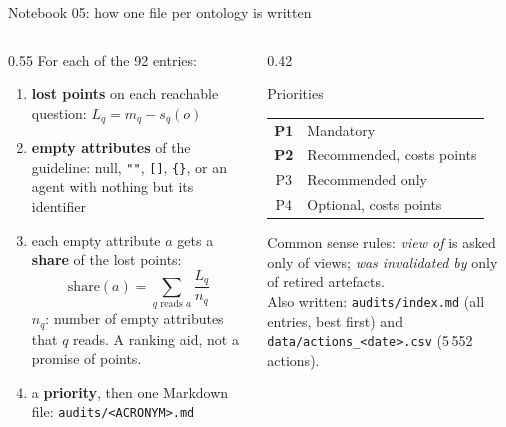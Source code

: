 \documentclass[aspectratio=169,10pt]{beamer}
\newcommand{\code}[1]{{\color{dtblue}\texttt{#1}}}
\begin{document}
\begin{frame}{Notebook 05: how one file per ontology is written}
  \begin{columns}[T]
    \begin{column}{0.55\textwidth}
      \small
      For each of the 92 entries:
      \begin{enumerate}
        \item \textbf{lost points} on each reachable question: $L_q = m_q - s_q(o)$
        \item \textbf{empty attributes} of the guideline: null, \code{""}, \code{[]}, \code{\{\}}, or an
              agent with nothing but its identifier
        \item each empty attribute $a$ gets a \textbf{share} of the lost points:
              \[ \text{share}(a) = \sum_{q \text{ reads } a} \frac{L_q}{n_q} \]
              {\scriptsize $n_q$: number of empty attributes that $q$ reads. A ranking aid, not a promise of points.}
        \item a \textbf{priority}, then one Markdown file: \code{audits/<ACRONYM>.md}
      \end{enumerate}
    \end{column}
    \begin{column}{0.42\textwidth}
      \begin{block}{Priorities}
        \small
        \begin{tabular}{@{}c l@{}}
          \textbf{P1} & Mandatory\\
          \textbf{P2} & Recommended, costs points\\
          P3 & Recommended only\\
          P4 & Optional, costs points\\
        \end{tabular}
      \end{block}
      \vspace{2pt}
      {\scriptsize Common sense rules: \emph{view of} is asked only of views; \emph{was invalidated by}
      only of retired artefacts.}\\[4pt]
      {\small Also written: \code{audits/index.md} (all entries, best first) and
      \code{data/actions\_<date>.csv} (5\,552 actions).}
    \end{column}
  \end{columns}
\end{frame}
\end{document}
